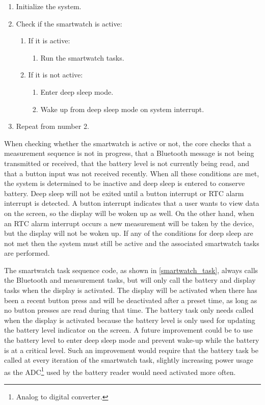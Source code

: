 \singlespacing
\begin{enumerate}
  \item{} Initialize the system.
  \item{} Check if the smartwatch is active:
\begin{enumerate}
  \item{} If it is active:
\begin{enumerate}
  \item{} Run the smartwatch tasks.
\end{enumerate}
  \item{} If it is not active:
\begin{enumerate}
  \item{} Enter deep sleep mode.
  \item{} Wake up from deep sleep mode on system interrupt.
\end{enumerate}
\end{enumerate}
  \item{} Repeat from number 2.
\end{enumerate}
\doublespacing
When checking whether the smartwatch is active or not, the core checks that a measurement sequence is not in progress, that a Bluetooth message is not being transmitted or received, that the battery level is not currently being read, and that a button input was not received recently. When all these conditions are met, the system is determined to be inactive and deep sleep is entered to conserve battery. Deep sleep will not be exited until a button interrupt or RTC alarm interrupt is detected. A button interrupt indicates that a user wants to view data on the screen, so the display will be woken up as well. On the other hand, when an RTC alarm interrupt occurs a new measurement will be taken by the device, but the display will not be woken up. If any of the conditions for deep sleep are not met then the system must still be active and the associated smartwatch tasks are performed.

The smartwatch task sequence code, as shown in \ref{smartwatch_task}, always calls the Bluetooth and measurement tasks, but will only call the battery and display tasks when the display is activated. The display will be activated when there has been a recent button press and will be deactivated after a preset time, as long as no button presses are read during that time. The battery task only needs called when the display is activated because the battery level is only used for updating the battery level indicator on the screen. A future improvement could be to use the battery level to enter deep sleep mode and prevent wake-up while the battery is at a critical level. Such an improvement would require that the battery task be called at every iteration of the smartwatch task, slightly increasing power usage as the ADC\footnote{Analog to digital converter.} used by the battery reader would need activated more often.

